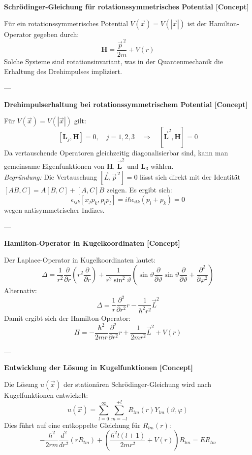 \documentclass[10pt, letterpaper]{article}
\begin{document}
\textbf{Schrödinger-Gleichung für rotationssymmetrisches Potential [Concept]}

Für ein rotationssymmetrisches Potential $V(\vec{x}) = V(|\vec{x}|)$ ist der Hamilton-Operator gegeben durch:
\[
\mathbf{H} = \frac{\vec{p}^{\,2}}{2m} + V(r)
\]
Solche Systeme sind rotationsinvariant, was in der Quantenmechanik die Erhaltung des Drehimpulses impliziert.

---

\textbf{Drehimpulserhaltung bei rotationssymmetrischem Potential [Concept]}

Für $V(\vec{x}) = V(|\vec{x}|)$ gilt:
\[
[\mathbf{L}_j, \mathbf{H}] = 0, \quad j=1,2,3 \quad \Rightarrow \quad [\vec{\mathbf{L}}^2, \mathbf{H}] = 0
\]
Da vertauschende Operatoren gleichzeitig diagonalisierbar sind, kann man gemeinsame Eigenfunktionen von $\mathbf{H}$, $\vec{\mathbf{L}}^2$ und $\mathbf{L}_3$ wählen.\\

\textit{Begründung:} Die Vertauschung $[\vec{L}, \vec{p}^{\,2}] = 0$ lässt sich direkt mit der Identität $[AB, C] = A[B,C] + [A,C]B$ zeigen. Es ergibt sich:
\[
\epsilon_{ijk}[x_j p_k, p_l p_l] = i \hbar \epsilon_{ilk}(p_l + p_k) = 0
\]
wegen antisymmetrischer Indizes.

---

\textbf{Hamilton-Operator in Kugelkoordinaten [Concept]}

Der Laplace-Operator in Kugelkoordinaten lautet:
\[
\Delta = \frac{1}{r^2} \frac{\partial}{\partial r} \left( r^2 \frac{\partial}{\partial r} \right) + \frac{1}{r^2 \sin^2 \vartheta} \left( \sin \vartheta \frac{\partial}{\partial \vartheta} \sin \vartheta \frac{\partial}{\partial \vartheta} + \frac{\partial^2}{\partial \varphi^2} \right)
\]
Alternativ:
\[
\Delta = \frac{1}{r} \frac{\partial^2}{\partial r^2} r - \frac{1}{\hbar^2 r^2} \vec{L}^2
\]
Damit ergibt sich der Hamilton-Operator:
\[
H = -\frac{\hbar^2}{2m r} \frac{\partial^2}{\partial r^2} r + \frac{1}{2 m r^2} \vec{L}^2 + V(r)
\]

---

\textbf{Entwicklung der Lösung in Kugelfunktionen [Concept]}

Die Lösung $u(\vec{x})$ der stationären Schrödinger-Gleichung wird nach Kugelfunktionen entwickelt:
\[
u(\vec{x}) = \sum_{l=0}^\infty \sum_{m=-l}^{+l} R_{lm}(r) Y_{lm}(\vartheta, \varphi)
\]
Dies führt auf eine entkoppelte Gleichung für $R_{lm}(r)$:
\[
-\frac{\hbar^2}{2 r m} \frac{d^2}{d r^2} (r R_{lm}) + \left( \frac{\hbar^2 l(l+1)}{2mr^2} + V(r) \right) R_{lm} = E R_{lm}
\]
\end{document}
